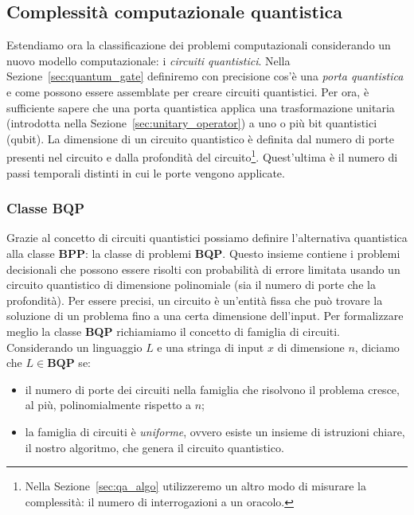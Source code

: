 \subsection{Complessità computazionale quantistica}
Estendiamo ora la classificazione dei problemi computazionali considerando un nuovo modello computazionale: i \emph{circuiti quantistici}. Nella Sezione~\ref{sec:quantum_gate} definiremo con precisione cos'è una \emph{porta quantistica} e come possono essere assemblate per creare circuiti quantistici. Per ora, è sufficiente sapere che una porta quantistica applica una trasformazione unitaria (introdotta nella Sezione~\ref{sec:unitary_operator}) a uno o più bit quantistici (qubit). La dimensione di un circuito quantistico è definita dal numero di porte presenti nel circuito e dalla profondità del circuito\footnote{Nella Sezione~\ref{sec:qa_algo} utilizzeremo un altro modo di misurare la complessità: il numero di interrogazioni a un oracolo.}. Quest'ultima è il numero di passi temporali distinti in cui le porte vengono applicate.

\subsubsection*{Classe BQP}
Grazie al concetto di circuiti quantistici possiamo definire l'alternativa quantistica alla classe \textbf{BPP}: la classe di problemi \textbf{BQP}. Questo insieme contiene i problemi decisionali che possono essere risolti con probabilità di errore limitata usando un circuito quantistico di dimensione polinomiale (sia il numero di porte che la profondità). Per essere precisi, un circuito è un'entità fissa che può trovare la soluzione di un problema fino a una certa dimensione dell'input. Per formalizzare meglio la classe \textbf{BQP} richiamiamo il concetto di famiglia di circuiti. Considerando  un linguaggio $L$ e una stringa di input $x$ di dimensione $n$, diciamo che $L \in \textbf{BQP}$ se: 
\begin{itemize}
	\item il numero di porte dei circuiti nella famiglia che risolvono il problema cresce, al più, polinomialmente rispetto a $n$;
	\item la famiglia di circuiti è \emph{uniforme}, ovvero esiste un insieme di istruzioni chiare, il nostro algoritmo, che genera il circuito quantistico.
\end{itemize}


